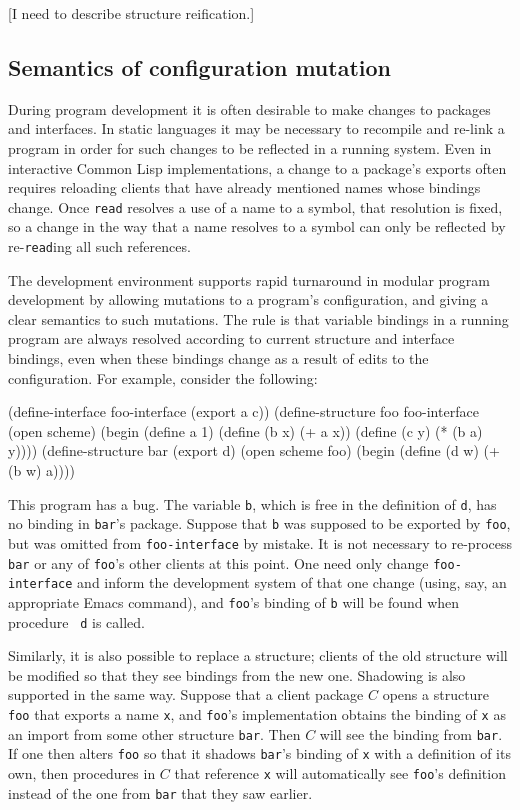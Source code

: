 [I need to describe structure reification.]


\subsection*{Semantics of configuration mutation}

During program development it is often desirable to make changes to
packages and interfaces.  In static languages it may be necessary to
recompile and re-link a program in order for such changes to be
reflected in a running system.  Even in interactive Common Lisp
implementations, a change to a package's exports often requires
reloading clients that have already mentioned names whose bindings
change.  Once {\tt read} resolves a use of a name to a symbol, that
resolution is fixed, so a change in the way that a name resolves to a
symbol can only be reflected by re-{\tt read}ing all such references.

The \hack{} development environment supports rapid turnaround in
modular program development by allowing mutations to a program's
configuration, and giving a clear semantics to such mutations.  The
rule is that variable bindings in a running program are always
resolved according to current structure and interface bindings, even
when these bindings change as a result of edits to the configuration.
For example, consider the following:
\begin{code}
    (define-interface foo-interface (export a c))
    (define-structure foo foo-interface
      (open scheme)
      (begin (define a 1)
             (define (b x) (+ a x))
             (define (c y) (* (b a) y))))
    (define-structure bar (export d)
      (open scheme foo)
      (begin (define (d w) (+ (b w) a))))
\end{code}
This program has a bug.  The variable {\tt b}, which is free in the
definition of {\tt d}, has no binding in {\tt bar}'s package.  Suppose
that {\tt b} was supposed to be exported by {\tt foo}, but was omitted
from {\tt foo-interface} by mistake.  It is not necessary to
re-process {\tt bar} or any of {\tt foo}'s other clients at this point.
One need only change {\tt foo-interface} and inform the development
system of that one change (using, say, an appropriate Emacs command),
and {\tt foo}'s binding of {\tt b} will be found when procedure {\tt
d} is called.

Similarly, it is also possible to replace a structure; clients of the
old structure will be modified so that they see bindings from the new
one.  Shadowing is also supported in the same way.  Suppose that a
client package $C$ opens a structure {\tt foo} that exports a name
{\tt x}, and {\tt foo}'s implementation obtains the binding of {\tt x}
as an import from some other structure {\tt bar}.  Then $C$ will see
the binding from {\tt bar}.  If one then alters {\tt foo} so that it
shadows {\tt bar}'s binding of {\tt x} with a definition of its own,
then procedures in $C$ that reference {\tt x} will automatically see
{\tt foo}'s definition instead of the one from {\tt bar} that they saw
earlier.

